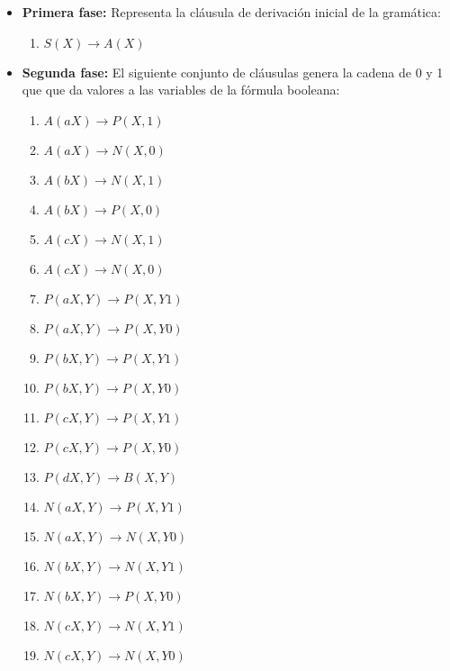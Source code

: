 \documentclass[12pt]{article}
\begin{document}
\begin{itemize}
    \item \textbf{Primera fase:} Representa la cláusula de derivación inicial de la gramática:
          \begin{enumerate}
              \item $S(X)\to A(X)$
          \end{enumerate}

    \item \textbf{Segunda fase:} El siguiente conjunto de cláusulas genera la cadena de 0 y 1 que que da valores a las variables de la
          fórmula booleana:
          \begin{multicols}{2}
              \begin{enumerate}[start=2]
                  \item $A(aX)\to P(X,1)$
                  \item $A(aX)\to N(X,0)$
                  \item $A(bX)\to N(X,1)$
                  \item $A(bX)\to P(X,0)$
                  \item $A(cX)\to N(X,1)$
                  \item $A(cX)\to N(X,0)$

                  \item $P(aX,Y)\to P(X,Y1)$
                  \item $P(aX,Y)\to P(X,Y0)$
                  \item $P(bX,Y)\to P(X,Y1)$
                  \item $P(bX,Y)\to P(X,Y0)$
                  \item $P(cX,Y)\to P(X,Y1)$
                  \item $P(cX,Y)\to P(X,Y0)$
                  \item $P(dX,Y)\to B(X,Y)$

                  \item $N(aX,Y)\to P(X,Y1)$
                  \item $N(aX,Y)\to N(X,Y0)$
                  \item $N(bX,Y)\to N(X,Y1)$
                  \item $N(bX,Y)\to P(X,Y0)$
                  \item $N(cX,Y)\to N(X,Y1)$
                  \item $N(cX,Y)\to N(X,Y0)$
              \end{enumerate}
          \end{multicols}


\end{itemize}
\end{document}
